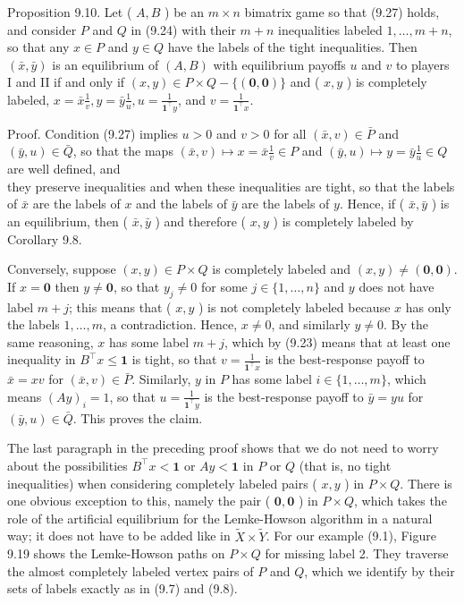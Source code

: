 \documentclass[12pt]{article}
\begin{document}
Proposition 9.10. Let ( $A, B$ ) be an $m \times n$ bimatrix game so that (9.27) holds, and consider $P$ and $Q$ in (9.24) with their $m+n$ inequalities labeled $1, \ldots, m+n$, so that any $x \in P$ and $y \in Q$ have the labels of the tight inequalities. Then $(\bar{x}, \bar{y})$ is an equilibrium of $(A, B)$ with equilibrium payoffs $u$ and $v$ to players I and II if and only if $(x, y) \in P \times Q-\{(\mathbf{0}, \mathbf{0})\}$ and ( $x, y$ ) is completely labeled, $x=\bar{x} \frac{1}{v}, y=\bar{y} \frac{1}{u}, u=\frac{1}{\mathbf{1}^{\top} y}$, and $v=\frac{1}{\mathbf{1}^{\top} x}$.

Proof. Condition (9.27) implies $u>0$ and $v>0$ for all $(\bar{x}, v) \in \bar{P}$ and $(\bar{y}, u) \in \bar{Q}$, so that the maps $(\bar{x}, v) \mapsto x=\bar{x} \frac{1}{v} \in P$ and $(\bar{y}, u) \mapsto y=\bar{y} \frac{1}{u} \in Q$ are well defined, and\\
they preserve inequalities and when these inequalities are tight, so that the labels of $\bar{x}$ are the labels of $x$ and the labels of $\bar{y}$ are the labels of $y$. Hence, if ( $\bar{x}, \bar{y}$ ) is an equilibrium, then ( $\bar{x}, \bar{y}$ ) and therefore ( $x, y$ ) is completely labeled by Corollary 9.8.

Conversely, suppose $(x, y) \in P \times Q$ is completely labeled and $(x, y) \neq(\mathbf{0}, \mathbf{0})$. If $x=\mathbf{0}$ then $y \neq \mathbf{0}$, so that $y_{j} \neq 0$ for some $j \in\{1, \ldots, n\}$ and $y$ does not have label $m+j$; this means that ( $x, y$ ) is not completely labeled because $x$ has only the labels $1, \ldots, m$, a contradiction. Hence, $x \neq 0$, and similarly $y \neq 0$. By the same reasoning, $x$ has some label $m+j$, which by (9.23) means that at least one inequality in $B^{\top} x \leq \mathbf{1}$ is tight, so that $v=\frac{1}{\mathbf{1}^{\top} x}$ is the best-response payoff to $\bar{x}=x v$ for $(\bar{x}, v) \in \bar{P}$. Similarly, $y$ in $P$ has some label $i \in\{1, \ldots, m\}$, which means $(A y)_{i}=1$, so that $u=\frac{1}{\mathbf{1}^{\top} y}$ is the best-response payoff to $\bar{y}=y u$ for $(\bar{y}, u) \in \bar{Q}$. This proves the claim.

The last paragraph in the preceding proof shows that we do not need to worry about the possibilities $B^{\top} x<\mathbf{1}$ or $A y<\mathbf{1}$ in $P$ or $Q$ (that is, no tight inequalities) when considering completely labeled pairs ( $x, y$ ) in $P \times Q$. There is one obvious exception to this, namely the pair ( $\mathbf{0 , 0}$ ) in $P \times Q$, which takes the role of the artificial equilibrium for the Lemke-Howson algorithm in a natural way; it does not have to be added like in $\tilde{X} \times \tilde{Y}$. For our example (9.1), Figure 9.19 shows the Lemke-Howson paths on $P \times Q$ for missing label 2. They traverse the almost completely labeled vertex pairs of $P$ and $Q$, which we identify by their sets of labels exactly as in (9.7) and (9.8).
\end{document}
